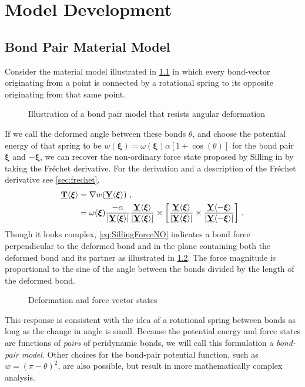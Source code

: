 \chapter{Model Development}
\label{ch:ModelDev}

\section{Bond Pair Material Model}
Consider the material model illustrated in \cref{fig:SimpleBondpair} in which every bond-vector originating from a point is connected by a rotational spring to its opposite originating from that same point.
%
\begin{figure}[h]
\centering
{}
\caption{Illustration of a bond pair model that resists angular deformation}
\label{fig:SimpleBondpair}
\end{figure}
%
If we call the deformed angle between these bonds \(\theta\), and choose the potential energy of that spring to be \(w(\boldsymbol{\xi}) = \omega(\boldsymbol{\xi})\alpha [1 + \cos(\theta) ] \) for the bond pair $\boldsymbol{\xi}$ and $-\boldsymbol{\xi}$, we can recover the non-ordinary force state proposed by Silling in \cite{silling2007peridynamic} by taking the Fr\'echet derivative. For the derivation and a description of the Fr\'echet derivative see \cref{sec:frechet}.
%
\begin{align}
\label{eq:SillingForceNO}
\vstate{T}{}{\boldsymbol{\xi}} &= \nabla w\!\left(\vstate{Y}{}{\boldsymbol{\xi}}\right)\, ,\notag \\
%
&=\omega(\boldsymbol{\xi})\frac{-\alpha}{|\vstate{Y}{}{\boldsymbol{\xi}}|} \frac{\vstate{Y}{}{\boldsymbol{\xi}}}{|\vstate{Y}{}{\boldsymbol{\xi}}|} \times \left[\frac{\vstate{Y}{}{\boldsymbol{\xi}}}{|\vstate{Y}{}{\boldsymbol{\xi}}|} \times \frac{\vstate{Y}{}{-\boldsymbol{\xi}}}{|\vstate{Y}{}{-\boldsymbol{\xi}}|}\right]\, .
\end{align}
%
Though it looks complex, \cref{eq:SillingForceNO} indicates a bond force perpendicular to the deformed bond and in the plane containing both the deformed bond and its partner as illustrated in \cref{fig:Bondpair}. 
The force magnitude is proportional to the sine of the angle between the bonds divided by the length of the deformed bond. 
%
\begin{figure}[h]
  \vspace{5mm}
\centering
{}
\caption{Deformation and force vector states}
\label{fig:Bondpair}
\end{figure}
%
This response is consistent with the idea of a rotational spring between bonds as long as the change in angle is small. 
Because the potential energy and force states are functions of \textit{pairs} of peridynamic bonds, we will call this formulation a \textit{bond-pair model}. 
Other choices for the bond-pair potential function, such as $w = (\pi - \theta)^2$, are also possible, but result in more mathematically complex analysis.

